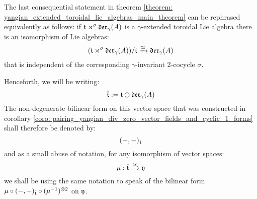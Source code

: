         \begin{remark}
            The last consequential statement in theorem \ref{theorem: yangian_extended_toroidal_lie_algebras_main_theorem} can be rephrased equivalently as follows: if $\mathfrak{t} \rtimes^{\sigma} \mathfrak{der}_{\gamma}(A)$ is a $\gamma$-extended toroidal Lie algebra there is an isomorphism of Lie algebras:
                $$( \mathfrak{t} \rtimes^{\sigma} \mathfrak{der}_{\gamma}(A) )/\mathfrak{t} \xrightarrow[]{\simeq} \mathfrak{der}_{\gamma}(A)$$
            that is independent of the corresponding $\gamma$-invariant $2$-cocycle $\sigma$.
        \end{remark}
        \begin{remark}
        \end{remark}
        
        \begin{convention}
            Henceforth, we will be writing:
                $$\hat{\mathfrak{t}} := \mathfrak{t} \oplus \mathfrak{der}_{\gamma}(A)$$
            The non-degenerate bilinear form on this vector space that was constructed in corollary \ref{coro: pairing_yangian_div_zero_vector_fields_and_cyclic_1_forms} shall therefore be denoted by:
                $$(-, -)_{\hat{\mathfrak{t}}}$$
            and as a small abuse of notation, for any isomorphism of vector spaces:
                $$\mu: \hat{\mathfrak{t}} \xrightarrow[]{\simeq} \mathfrak{y}$$
            we shall be using the same notation to speak of the bilinear form $\mu \circ (-, -)_{\extendedtoroidal} \circ (\mu^{-1})^{\tensor 2}$ on $\mathfrak{y}$. 
        \end{convention}

